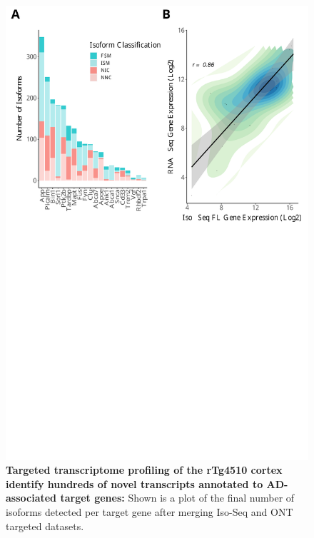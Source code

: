 \newpage
{}
\begin{figure}[]
	\centering
	\includegraphics[page=8,trim={0 26cm 0 0cm},clip,scale = 0.55]{Figures/ONTvsIsoSeq.pdf}
	\captionsetup{width=0.95\textwidth}
	\caption[Final number of isoforms identified from targeted transcriptome profiling of the rTg4510 cortex]%
	{\textbf{Targeted transcriptome profiling of the rTg4510 cortex identify hundreds of novel transcripts annotated to AD-associated target genes:} Shown is a plot of the final number of isoforms detected per target gene after merging Iso-Seq and ONT targeted datasets.}
	\label{fig:final_targeted_num}
\end{figure}

